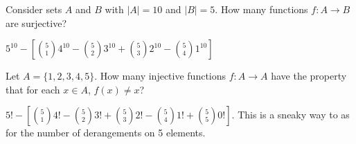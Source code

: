 \begin{questions}
	

\question Consider sets $A$ and $B$ with $|A| = 10$ and $|B| = 5$.  How many functions $f: A \to B$ are surjective?

	\begin{answer}
	$5^{10} - \left[{5 \choose 1}4^{10} - {5 \choose 2}3^{10} + {5 \choose 3}2^{10} - {5 \choose 4}1^{10}\right]$ %
	\end{answer}
	
	


\question Let $A = \{1,2,3,4,5\}$.  How many injective functions $f:A \to A$ have the property that for each $x \in A$, $f(x) \ne x$?

	\begin{answer}
	$5! - \left[{5 \choose 1}4! - {5 \choose 2}3! + {5 \choose 3}2! - {5 \choose 4}1! + {5 \choose 5}0!\right]$.  This is a sneaky way to as for the number of derangements on 5 elements. %
	\end{answer}

	

\end{questions}